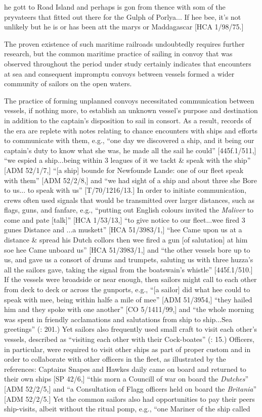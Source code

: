 he gott to Road Island and perhaps is gon from thence with som of the pryvateers that fitted out there for the Gulph of Porlya... If hee bee, it’s not unlikely but he is or has been att the marys or Maddagascar [HCA 1/98/75.] 

The proven existence of such maritime railroads undoubtedly requires further research, but the common maritime practice of sailing in convoy that was observed throughout the period under study certainly indicates that encounters at sea and consequent impromptu convoys between vessels formed a wider community of sailors on the open waters. 

The practice of forming unplanned convoys necessitated communication between vessels, if nothing more, to establish an unknown vessel’s purpose and destination in addition to the captain’s disposition to sail in consort. As a result, records of the era are replete with notes relating to chance encounters with ships and efforts to communicate with them, e.g., “one day we discovered a ship, and it being our captain’s duty to know what she was, he made all the sail he could” [445f.1/511,] “we espied a ship...being within 3 leagues of it we tackt \& speak with the ship” [ADM 52/1/7,] “[a ship] bounde for Newfounde Lande: one of our fleet speak with them” [ADM 52/2/8,] and “we had sight of a ship and about three she Bore to us... to speak with us” [T/70/1216/13.] In order to initiate communication, crews often used signals that would be transmitted over larger distances, such as flags, guns, and fanfare, e.g., “putting out English colours invited the \textit{Maliver} to come and pate [talk]” [HCA 1/53/13,] “to give notice to our fleet...wee fired 3 gunes Distance and ...a muskett” [HCA 51/3983/1,] “hee Came upon us at a distance \& spread his Dutch collors then wee fired a gun [of salutation] at him soe hee Came unboard us” [HCA 51/3983/1,] and “the other vessels bore up to us, and gave us a consort of drums and trumpets, saluting us with three huzza’s all the sailors gave, taking the signal from the boatswain’s whistle”  [445f.1/510.] If the vessels were broadside or near enough, then sailors might call to each other from deck to deck or across the gunports, e.g., “[a sailor] did what hee could to speak with mee, being within halfe a mile of mee” [ADM 51/3954,] “they hailed him and they spoke with one another” [CO 5/1411/99,] and “the whole morning was spent in friendly acclamations and salutations from ship to ship...Sea greetings” (\citealt{Gage1648}: 201.) Yet sailors also frequently used small craft to visit each other’s vessels, described as “visiting each other with their Cock-boates” (\citealt{Gage1648}: 15.)  Officers, in particular, were required to visit other ships as part of proper custom and in order to collaborate with other officers in the fleet, as illustrated by the references: Captains Snapes and Hawkes daily came on board and returned to their own ships [SP 42/6,] “this morn a Councill of war on board the \textit{Dutches}” [ADM 52/2/5,] and “a Consultation of Flagg officers held on board the \textit{Britania}” [ADM 52/2/5.] Yet the common sailors also had opportunities to pay their peers ship-visits, albeit without the ritual pomp, e.g., “one Mariner of the ship called 
